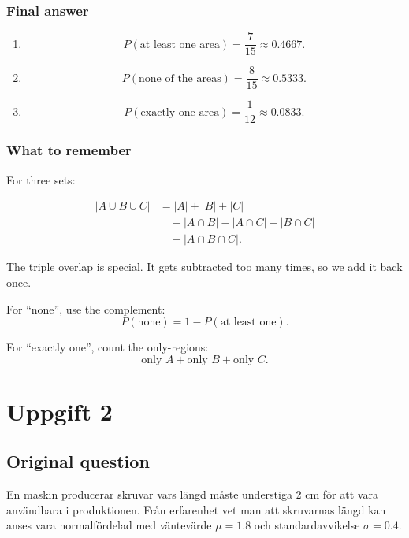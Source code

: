 \documentclass[10pt]{article}
\begin{document}
\subsubsection*{Final answer}

\begin{enumerate}[label=\alph*)]
\item
\[
P(\text{at least one area})
=
\frac{7}{15}
\approx 0.4667.
\]

\item
\[
P(\text{none of the areas})
=
\frac{8}{15}
\approx 0.5333.
\]

\item
\[
P(\text{exactly one area})
=
\frac{1}{12}
\approx 0.0833.
\]
\end{enumerate}

\subsubsection*{What to remember}

For three sets:

\begin{align*}
|A\cup B\cup C|
&=
|A|+|B|+|C| \\
&\quad
-|A\cap B|-|A\cap C|-|B\cap C| \\
&\quad
+|A\cap B\cap C|.
\end{align*}

The triple overlap is special. It gets subtracted too many times, so
we add it back once.

For ``none'', use the complement:
\[
P(\text{none})=1-P(\text{at least one}).
\]

For ``exactly one'', count the only-regions:
\[
\text{only }A+\text{only }B+\text{only }C.
\]

\section*{Uppgift 2}

\subsection*{Original question}

En maskin producerar skruvar vars längd måste
understiga 2 cm för att vara användbara i
produktionen. Från erfarenhet vet man att skruvarnas
längd kan anses vara normalfördelad med väntevärde
\(\mu=1.8\) och standardavvikelse \(\sigma=0.4\).
\end{document}
